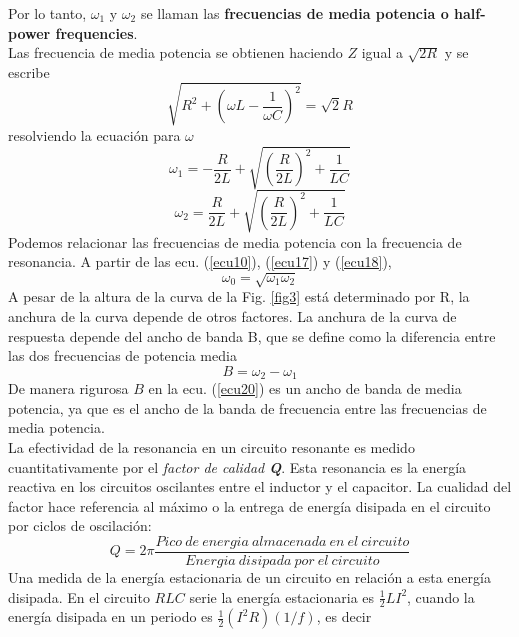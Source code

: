 \documentclass[twocolumn]{IEEEtran}
\begin{document}
\noindent
Por lo tanto, $\omega _1$ y $\omega _2$ se llaman las \textbf{frecuencias de media potencia o half-power frequencies}.\\
Las frecuencia de media potencia se obtienen haciendo $Z$ igual a $\sqrt{2 R}$ y se escribe
\begin{equation}
 \sqrt {{R^2} + {{\left( {\omega L - \frac{1}{{\omega C}}} \right)}^2}}  = \sqrt 2 R
\label{ecu16}
\end{equation}
\noindent resolviendo la ecuación para $\omega$
\begin{equation}
 {\omega _1} =  - \frac{R}{{2L}} + \sqrt {{{\left( {\frac{R}{{2L}}} \right)}^2} + \frac{1}{{LC}}} 
\label{ecu17}
\end{equation}
\begin{equation}
 {\omega _2} =  \frac{R}{{2L}} + \sqrt {{{\left( {\frac{R}{{2L}}} \right)}^2} + \frac{1}{{LC}}} 
\label{ecu18}
\end{equation}
\noindent
Podemos relacionar las frecuencias de media potencia con la frecuencia de resonancia. A partir de las ecu. (\ref{ecu10}), (\ref{ecu17}) y (\ref{ecu18}),
\begin{equation}
 \omega _0 = \sqrt{\omega _1 \omega _2}
\label{ecu19}
\end{equation}
\noindent
A pesar de la altura de la curva de la Fig. \ref{fig3} está determinado por R, la anchura de la curva depende de otros factores. La anchura de la curva de respuesta depende del ancho de banda B, que se define como la diferencia entre las dos frecuencias de potencia media
\begin{equation}
 B = \omega _2 - \omega _1
\label{ecu20}
\end{equation}
\noindent
De manera rigurosa $B$ en la ecu. (\ref{ecu20}) es un ancho de banda de media potencia, ya que es el ancho de la banda de frecuencia entre las frecuencias de media potencia.\\
La efectividad de la resonancia en un circuito resonante es medido cuantitativamente por el \textit{factor de calidad \textbf{Q}}.
Esta resonancia es la energía reactiva en los circuitos oscilantes entre el inductor y el capacitor. La cualidad del factor hace referencia al máximo o la entrega de energía disipada en el circuito por ciclos de oscilación:
\begin{equation}
 Q = 2 \pi \frac{Pico\ de\ energia\ almacenada\ en\ el\ circuito}{Energia\ disipada\ por\ el\ circuito}
\label{ecu21}
\end{equation}
\noindent
Una medida de la energía estacionaria de un circuito en relación a esta energía disipada. En el circuito $RLC$ serie la energía estacionaria es $\frac{1}{2} L I^2$, cuando la energía disipada en un periodo es $\frac{1}{2} (I^2 R)(1/f)$, es decir
\end{document}
